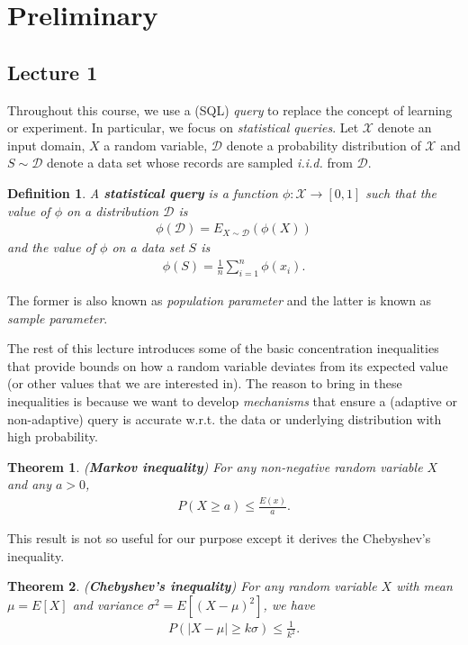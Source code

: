 \documentclass[]{article}
\newtheorem{theorem}{Theorem}[section]
\newtheorem{definition}{Definition}[section] %
\begin{document}
\section{Preliminary}

\subsection{Lecture 1}
Throughout this course, we use a (SQL) \textit{query} to replace the concept of learning or experiment. In particular, we focus on \textit{statistical queries}. Let $\mathcal{X}$ denote an input domain, $X$ a random variable, $\mathcal{D}$ denote a probability distribution of $\mathcal{X}$ and $S\sim \mathcal{D}$ denote a data set whose records are sampled \textit{i.i.d.} from $\mathcal{D}$.

\begin{definition}
	A \textbf{statistical query} is a function $\phi:\mathcal{X} \rightarrow [0,1]$ such that the value of $\phi$ on a distribution $\mathcal{D}$ is 
	\begin{align}
		\phi(\mathcal{D}) = E_{X \sim \mathcal{D}}(\phi(X))
	\end{align}
	and the value of $\phi$ on a data set $S$ is 
	\begin{align}
		\phi(S) = \frac{1}{n} \sum_{i =1}^n \phi(x_i).
	\end{align}
\end{definition}
The former is also known as \textit{population parameter} and the latter is known as \textit{sample parameter}. 
 
The rest of this lecture introduces some of the basic concentration inequalities that provide bounds on how a random variable deviates from its expected value (or other values that we are interested in). The reason to bring in these inequalities is because we want to develop \textit{mechanisms} that ensure a (adaptive or non-adaptive) query is accurate w.r.t. the data or underlying distribution with high probability. 

\begin{theorem} (\textbf{Markov inequality})
	For any non-negative random variable $X$ and any $a > 0$,
	\begin{align*}
		P(X \ge a) \le \frac{E(x)}{a}.
	\end{align*}
\end{theorem}
This result is not so useful for our purpose except it derives the Chebyshev's inequality. 

\begin{theorem} (\textbf{Chebyshev's inequality})
	For any random variable $X$ with mean $\mu=E[X]$ and variance $\sigma^2=E[(X-\mu)^2]$, we have 
	\begin{align*}
		P(|X-\mu| \ge k\sigma) \le \frac{1}{k^2}.
	\end{align*}
\end{theorem}
\end{document}
